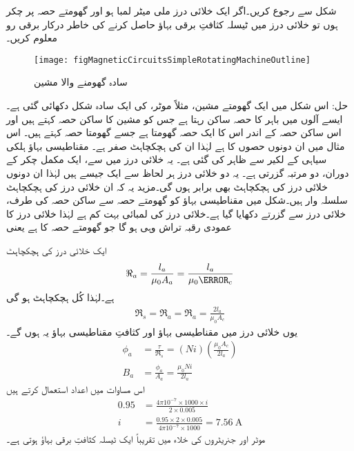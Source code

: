 %
شکل   سے رجوع کریں۔اگر ایک خلائی درز  ملی میٹر لمبا ہو اور گھومتے حصہ پر  چکر ہوں تو خلائی درز میں  ٹیسلہ کثافتِ برقی بہاؤ حاصل کرنے کی خاطر درکار برقی رو معلوم کریں۔
\begin{figure}
\centering
\texttt{[image: figMagneticCircuitsSimpleRotatingMachineOutline]}
\caption{سادہ گھومنے والا مشین}
\label{شکل_مقناطیسی_دور_سادہ_گھومتا_مشین}
\end{figure}
حل:
	 اس شکل میں ایک گھومتے مشین، مثلاً موٹر، کی ایک سادہ شکل دکھائی گئی ہے۔ ایسے آلوں میں باہر کا حصہ ساکن رہتا ہے جس کو مشین کا ساکن حصہ کہتے ہیں اور اس ساکن حصہ کے اندر اس کا ایک حصہ گھومتا ہے جسے گھومتا حصہ کہتے ہیں۔ اس مثال میں ان دونوں حصوں کا    ہے لہٰذا ان کی ہچکچاہٹ صفر ہے۔ مقناطیسی بہاؤ  ہلکی سیاہی کے لکیر سے ظاہر کی گئی ہے۔ یہ خلائی درز میں سے، ایک مکمل چکر کے دوران، دو مرتبہ گزرتی ہے۔ یہ دو خلائی درز ہر لحاظ سے ایک جیسے ہیں لہٰذا ان دونوں خلائی درز کی ہچکچاہٹ بھی برابر ہوں گی۔مزید یہ کہ ان خلائی درز کی ہچکچاہٹ سلسلہ وار ہیں۔شکل میں مقناطیسی بہاؤ کو گھومتے حصہ سے ساکن حصہ کی طرف، خلائی درز سے گزرتے دکھایا گیا ہے۔خلائی درز کی لمبائی  بہت کم ہے لہٰذا خلائی درز کا عمودی رقبہ تراش  وہی ہو گا جو گھومتے حصہ کا ہے یعنی  

  ایک خلائی درز کی ہچکچاہٹ
\begin{align*}
\Re_a=\frac{l_a}{\mu_0 A_a}=\frac{l_a}{\mu_0 \A_c}
\end{align*}
ہے۔لہٰذا کُل ہچکچاہٹ ہو گی
\begin{align*}
\Re_s=\Re_a=\Re_a=\frac{2 l_a}{\mu_0 A_c}
\end{align*}
یوں خلائی درز میں مقناطیسی بہاؤ  اور کثافتِ مقناطیسی بہاؤ  یہ ہوں گے۔
\begin{align*}
\phi_a&=\frac{\tau}{\Re_s}=\left(N i \right) \left (\frac{\mu_0 A_c}{2 l_a} \right)\\
B_a&=\frac{\phi_a}{A_a}=\frac{\mu_0 N i}{2 l_a}
\end{align*}
اس مساوات میں اعداد استعمال کرتے ہیں
\begin{align*}
0.95&=\frac{4 \pi 10^{-7} \times 1000 \times i}{2 \times 0.005}\\
i&=\frac{0.95 \times 2 \times 0.005}{ 4 \pi 10^{-7} \times 1000}=\SI{7.56}{\ampere}
\end{align*}
موٹر اور جنریٹروں کی خلاء میں تقریباً ایک ٹیسلہ کثافتِ برقی بہاؤ ہوتی ہے۔

